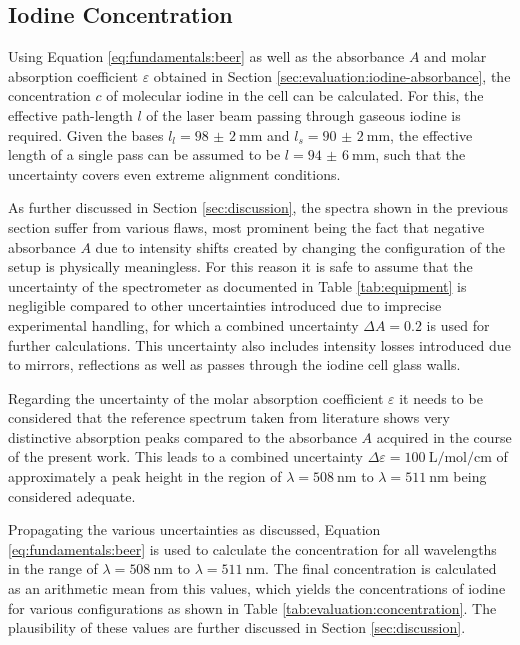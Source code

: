 \subsection{Iodine Concentration}
\label{sec:evaluation:iodine-concentration}

Using Equation \ref{eq:fundamentals:beer} as well as the absorbance $A$ and molar absorption coefficient $\varepsilon$ obtained in Section \ref{sec:evaluation:iodine-absorbance}, the concentration $c$ of molecular iodine in the cell can be calculated.
For this, the effective path-length $l$ of the laser beam passing through gaseous iodine is required. Given the bases $l_l = \SI{98(2)}{\mm}$ and $l_s = \SI{90(2)}{\mm}$, the effective length of a single pass can be assumed to be $l = \SI{94(6)}{\mm}$, such that the uncertainty covers even extreme alignment conditions.

As further discussed in Section \ref{sec:discussion}, the spectra shown in the previous section suffer from various flaws, most prominent being the fact that negative absorbance $A$ due to intensity shifts created by changing the configuration of the setup is physically meaningless. For this reason it is safe to assume that the uncertainty of the spectrometer as documented in Table \ref{tab:equipment} is negligible compared to other uncertainties introduced due to imprecise experimental handling, for which a combined uncertainty $\Delta A = 0.2$ is used for further calculations. This uncertainty also includes intensity losses introduced due to mirrors, reflections as well as passes through the iodine cell glass walls.

Regarding the uncertainty of the molar absorption coefficient $\varepsilon$ it needs to be considered that the reference spectrum taken from literature \cite{Iodine} shows very distinctive absorption peaks compared to the absorbance $A$ acquired in the course of the present work. This leads to a combined uncertainty $\Delta \varepsilon = \SI{100}{\L\per\mol\per\cm}$ of approximately a peak height in the region of $\lambda = \SI{508}{\nm}$ to $\lambda = \SI{511}{\nm}$ being considered adequate.

Propagating the various uncertainties as discussed, Equation \ref{eq:fundamentals:beer} is used to calculate the concentration for all wavelengths in the range of $\lambda = \SI{508}{\nm}$ to $\lambda = \SI{511}{\nm}$. The final concentration is calculated as an arithmetic mean from this values, which yields the concentrations of iodine for various configurations as shown in Table \ref{tab:evaluation:concentration}. The plausibility of these values are further discussed in Section \ref{sec:discussion}.

